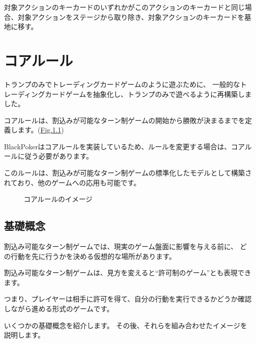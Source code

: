 \documentclass[letterpaper,10pt,dvipdfmx]{sphinxmanual}
\begin{document}
\sphinxAtStartPar
{}

\sphinxAtStartPar
対象アクションのキーカードのいずれかがこのアクションのキーカードと同じ場合、対象アクションをステージから取り除き、対象アクションのキーカードを墓地に移す。

\sphinxstepscope


\chapter{コアルール}
\label{\detokenize{core/core:core-rst}}\label{\detokenize{core/core:id1}}\label{\detokenize{core/core::doc}}
\sphinxAtStartPar
トランプのみでトレーディングカードゲームのように遊ぶために、
一般的なトレーディングカードゲームを抽象化し、トランプのみで遊べるように再構築しました。

\sphinxAtStartPar
コアルールは、割込みが可能なターン制ゲームの開始から勝敗が決まるまでを定義します。(\hyperref[\detokenize{core/core:abstract-core-rule}]{Fig.\@ \ref{\detokenize{core/core:abstract-core-rule}}})

\sphinxAtStartPar
BlackPokerはコアルールを実装しているため、ルールを変更する場合は、コアルールに従う必要があります。

\sphinxAtStartPar
このルールは、割込みが可能なターン制ゲームの標準化したモデルとして構築されており、他のゲームへの応用も可能です。

\begin{figure}[htbp]
\centering
\capstart

\noindent{}
\caption{コアルールのイメージ}\label{\detokenize{core/core:id34}}\label{\detokenize{core/core:abstract-core-rule}}\end{figure}


\section{基礎概念}
\label{\detokenize{core/core:id2}}
\sphinxAtStartPar
割込み可能なターン制ゲームでは、現実のゲーム盤面に影響を与える前に、
どの行動を先に行うかを決める仮想的な場所があります。

\sphinxAtStartPar
割込み可能なターン制ゲームは、見方を変えると“許可制のゲーム”とも表現できます。

\sphinxAtStartPar
つまり、プレイヤーは相手に許可を得て、自分の行動を実行できるかどうか確認しながら進める形式のゲームです。

\sphinxAtStartPar
いくつかの基礎概念を紹介します。
その後、それらを組み合わせたイメージを説明します。
\end{document}
